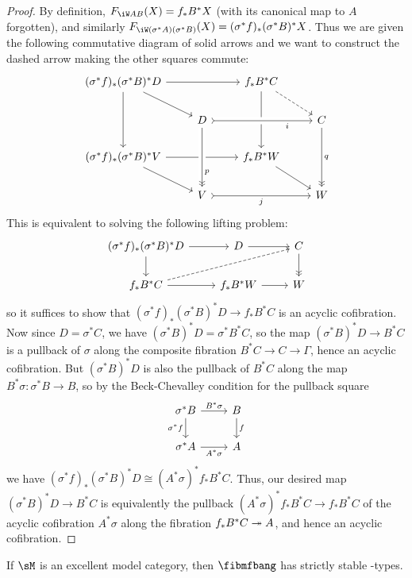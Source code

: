 \documentclass{amsart}
\let\W\iW
\begin{document}
\begin{proof}
  By definition, $F_{\W A B}(X) = f_* B^* X$ (with its canonical map to $A$ forgotten), and similarly $F_{\W (\sigma^*A) (\sigma^*B)}(X) = (\sigma^*f)_* (\sigma^*B)^* X$.
  Thus we are given the following commutative diagram of solid arrows and we want to construct the dashed arrow making the other squares commute:
  \[
  \begin{tikzcd}
    (\sigma^*f)_* (\sigma^*B)^* D \ar[rr] \ar[dr] \ar[dd] && f_* B^* C \ar[dr,dashed] \ar[dd]\\
    & D \ar[rr,>->,near end,"i",swap,crossing over] && C \ar[dd,->>,"q"] \\
    (\sigma^*f)_* (\sigma^*B)^* V \ar[rr] \ar[dr] && f_* B^* W \ar[dr] \\
    & V \ar[rr,>->,"j",swap] \ar[from=uu,crossing over,->>,near end,"p"] && W
  \end{tikzcd}
  \]
  This is equivalent to solving the following lifting problem:
  \[
  \begin{tikzcd}
    (\sigma^*f)_* (\sigma^*B)^* D \ar[r] \ar[d] & D \ar[r] & C \ar[d,->>] \\
    f_* B^* C \ar[urr,dashed] \ar[r] & f_* B^* W \ar[r] & W
  \end{tikzcd}
  \]
  so it suffices to show that $(\sigma^*f)_* (\sigma^*B)^* D \to f_* B^* C$ is an acyclic cofibration.
  Now since $D = \sigma^*C$, we have $(\sigma^*B)^*D = \sigma^* B^* C$, so the map $(\sigma^*B)^*D \to B^* C$ is a pullback of $\sigma$ along the composite fibration $B^*C \to C \to \Gamma$, hence an acyclic cofibration.
  But $(\sigma^*B)^*D$ is also the pullback of $B^* C$ along the map $B^*\sigma : \sigma^*B \to B$, so by the Beck-Chevalley condition for the pullback square
  \[
  \begin{tikzcd}
    \sigma^* B \ar[r,"{B^*\sigma}"] \ar[d,"{\sigma^* f}",swap] & B \ar[d,"f"]\\
    \sigma^* A \ar[r,"{A^*\sigma}",swap] & A
  \end{tikzcd}
  \]
  we have $(\sigma^*f)_* (\sigma^*B)^* D \cong (A^*\sigma)^* f_* B^* C$.
  Thus, our desired map $(\sigma^*B)^*D \to B^* C$ is equivalently the pullback $(A^*\sigma)^* f_* B^* C \to f_* B^* C$ of the acyclic cofibration $A^*\sigma$ along the fibration $f_* B^* C \twoheadrightarrow A$, and hence an acyclic cofibration.
\end{proof}

\begin{cor}
  If $\sM$ is an excellent model category, then $\fibmfbang$ has strictly stable \W-types.
\end{cor}




\end{document}
